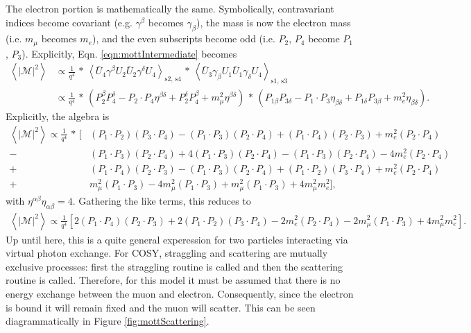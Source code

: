 The electron portion is mathematically the same. Symbolically, contravariant indices become covariant (e.g. $\gamma^\beta$ becomes $\gamma_\beta$), the mass is now the electron mass (i.e. $m_\mu$ becomes $m_e$), and the even subscripts become odd (i.e. $P_2$, $P_4$ become $P_1$, $P_3$). Explicitly, Eqn. \ref{eqn:mottIntermediate} becomes
\begin{align*}
\left< |\mathcal{M}|^2\right>
&\propto\frac{1}{q^4} \, * \, \left< \bar{U}_4 \gamma^\beta U_2 \bar{U}_2 \gamma^\delta U_4 \right> _\text{s2, s4} \, * \, \left< \bar{U}_3 \gamma_\beta U_1 \bar{U}_1 \gamma_\delta U_4 \right> _\text{s1, s3}\\
&\propto \frac{1}{q^4} \, * \, (P_2^\beta P_4^\delta - P_2 \cdot P_4 \eta^{\beta\delta}+P_2 ^\delta P_4 ^\beta + m_\mu ^2 \eta^{\beta\delta}) \, * \, (P_{1\beta} P_{3\delta} - P_1 \cdot P_3 \eta_{\beta\delta}+P_{1\delta} P_{3\beta} + m_e ^2 \eta_{\beta\delta}).
\end{align*}
Explicitly, the algebra is
\begin{align*}
\left< |\mathcal{M}|^2\right> \propto
\frac{1}{q^4} \, * \, [ &(P_1 \cdot P_2)(P_3 \cdot P_4)-(P_1\cdot P_3)(P_2 \cdot P_4) + (P_1 \cdot P_4)(P_2\cdot P_3)+m_e ^2 (P_2 \cdot P_4)\\
-&(P_1\cdot P_3)(P_2\cdot P_4)+4(P_1\cdot P_3)(P_2\cdot P_4)-(P_1\cdot P_3)(P_2\cdot P_4) - 4m_e ^2 (P_2 \cdot P_4)\\
+&(P_1\cdot P_4)(P_2 \cdot P_3)-(P_1 \cdot P_3)(P_2 \cdot P_4) + (P_1 \cdot P_2) (P_3 \cdot P_4) + m_e ^2 (P_2 \cdot P_4)\\
+&m_\mu ^2 (P_1 \cdot P_3)-4m_\mu ^2 (P_1\cdot P_3) + m_\mu ^2 (P_1 \cdot P_3) + 4m_\mu ^2 m_e ^2],
\end{align*}
with $\eta^{\alpha\beta} \eta_{\alpha\beta} = 4$. Gathering the like terms, this reduces to
\begin{align*}
\left< |\mathcal{M}|^2\right> \propto \frac{1}{q^4} [2(P_1 \cdot P_4)(P_2\cdot P_3)+2(P_1\cdot P_2)(P_3 \cdot P_4) - 2 m_e ^2 (P_2 \cdot P_4)-2m_\mu ^2 (P_1 \cdot P_3) + 4 m_\mu ^2 m_e ^2 ].
\end{align*}
Up until here, this is a quite general experession for two particles interacting via virtual photon exchange. For COSY, straggling and scattering are mutually exclusive processes: first the straggling routine is called and then the scattering routine is called. Therefore, for this model it must be assumed that there is no energy exchange between the muon and electron. Consequently, since the electron is bound it will remain fixed and the muon will scatter. This can be seen diagrammatically in Figure \ref{fig:mottScattering}.

